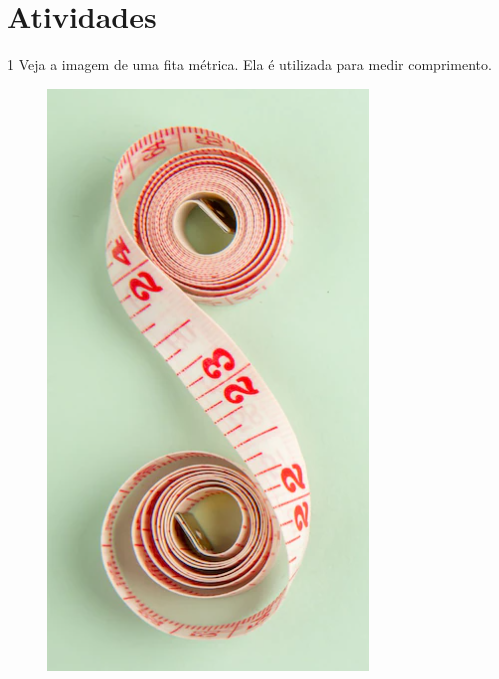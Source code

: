 

\section*{Atividades}

\num{1} Veja a imagem de uma fita métrica. Ela é utilizada para medir comprimento.

\begin{figure}[htpb!]
\centering
\includegraphics[width=.3\textwidth]{./media/image41.png}
\end{figure}

